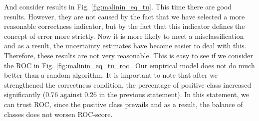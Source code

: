 \documentclass[a4paper,14pt]{extarticle}
\begin{document}
	And consider results in Fig. \ref{fig:malinin_eq_tu}. This time there are good results. However, they are not caused by the fact that we have selected a more reasonable correctness indicator, but by the fact that this indicator defines the concept of error more strictly. Now it is more likely to meet a misclassification and as a result, the uncertainty estimates have become easier to deal with this. Therefore, these results are not very reasonable. This is easy to see if we consider the ROC in Fig. \ref{fig:malinin_eq_tu_roc}. Our empirical model does not do much better than a random algorithm. It is important to note that after we strengthened the correctness condition, the percentage of positive class increased significantly (0.76 against 0.26 in the previous statement). In this statement, we can trust ROC, since the positive class prevails and as a result, the balance of classes does not worsen ROC-score.
	
\end{document}

